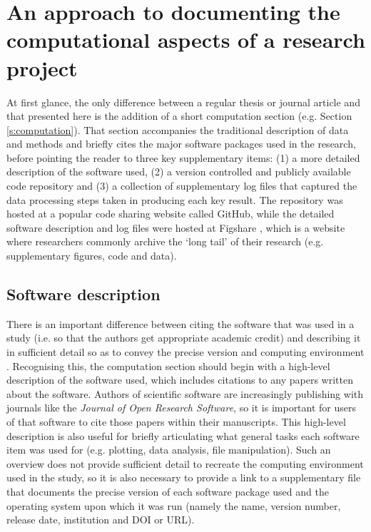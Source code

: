   
\section{An approach to documenting the computational aspects of a research project}\label{s:reproducibility_approach}

At first glance, the only difference between a regular thesis or journal article and that presented here is the addition of a short computation section (e.g. Section \ref{s:computation}). That section accompanies the traditional description of data and methods and briefly cites the major software packages used in the research, before pointing the reader to three key supplementary items: (1) a more detailed description of the software used, (2) a version controlled and publicly available code repository and (3) a collection of supplementary log files that captured the data processing steps taken in producing each key result. The repository was hosted at a popular code sharing website called GitHub, while the detailed software description and log files were hosted at Figshare \citep{Irving2015}, which is a website where researchers commonly archive the `long tail' of their research (e.g. supplementary figures, code and data). 

\subsection{Software description}

There is an important difference between citing the software that was used in a study (i.e. so that the authors get appropriate academic credit) and describing it in sufficient detail so as to convey the precise version and computing environment \citep{Jackson2012}. Recognising this, the computation section should begin with a high-level description of the software used, which includes citations to any papers written about the software. Authors of scientific software are increasingly publishing with journals like the \textit{Journal of Open Research Software}, so it is important for users of that software to cite those papers within their manuscripts. This high-level description is also useful for briefly articulating what general tasks each software item was used for (e.g. plotting, data analysis, file manipulation). Such an overview does not provide sufficient detail to recreate the computing environment used in the study, so it is also necessary to provide a link to a supplementary file that documents the precise version of each software package used and the operating system upon which it was run (namely the name, version number, release date, institution and DOI or URL). 

